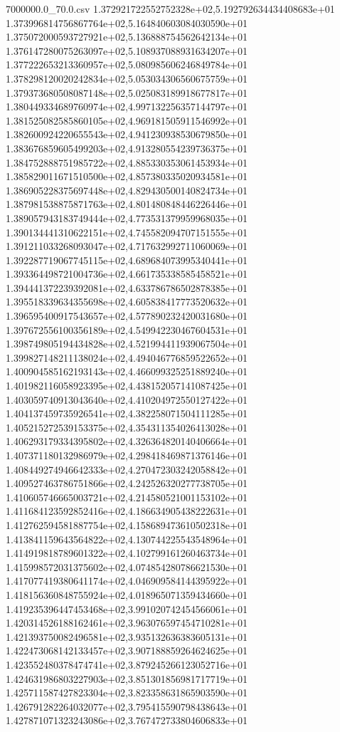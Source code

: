 \begin{filecontents*}{7000000.0_70.0.csv}
1.372921722552752328e+02,5.192792634434408683e+01
1.373996814756867764e+02,5.164840603084030590e+01
1.375072000593727921e+02,5.136888754562642134e+01
1.376147280075263097e+02,5.108937088931634207e+01
1.377222653213360957e+02,5.080985606246849784e+01
1.378298120020242834e+02,5.053034306560675759e+01
1.379373680508087148e+02,5.025083189918677817e+01
1.380449334689760974e+02,4.997132256357144797e+01
1.381525082585860105e+02,4.969181505911546992e+01
1.382600924220655543e+02,4.941230938530679850e+01
1.383676859605499203e+02,4.913280554239736375e+01
1.384752888751985722e+02,4.885330353061453934e+01
1.385829011671510500e+02,4.857380335020934581e+01
1.386905228375697448e+02,4.829430500140824734e+01
1.387981538875871763e+02,4.801480848446226446e+01
1.389057943183749444e+02,4.773531379959968035e+01
1.390134441310622151e+02,4.745582094707151555e+01
1.391211033268093047e+02,4.717632992711060069e+01
1.392287719067745115e+02,4.689684073995340441e+01
1.393364498721004736e+02,4.661735338585458521e+01
1.394441372239392081e+02,4.633786786502878385e+01
1.395518339634355698e+02,4.605838417773520632e+01
1.396595400917543657e+02,4.577890232420031680e+01
1.397672556100356189e+02,4.549942230467604531e+01
1.398749805194434828e+02,4.521994411939067504e+01
1.399827148211138024e+02,4.494046776859522652e+01
1.400904585162193143e+02,4.466099325251889240e+01
1.401982116058923395e+02,4.438152057141087425e+01
1.403059740913043640e+02,4.410204972550127422e+01
1.404137459735926541e+02,4.382258071504111285e+01
1.405215272539153375e+02,4.354311354026413028e+01
1.406293179334395802e+02,4.326364820140406664e+01
1.407371180132986979e+02,4.298418469871376146e+01
1.408449274946642333e+02,4.270472303242058842e+01
1.409527463786751866e+02,4.242526320277738705e+01
1.410605746665003721e+02,4.214580521001153102e+01
1.411684123592852416e+02,4.186634905438222631e+01
1.412762594581887754e+02,4.158689473610502318e+01
1.413841159643564822e+02,4.130744225543548964e+01
1.414919818789601322e+02,4.102799161260463734e+01
1.415998572031375602e+02,4.074854280786621530e+01
1.417077419380641174e+02,4.046909584144395922e+01
1.418156360848755924e+02,4.018965071359434660e+01
1.419235396447453468e+02,3.991020742454566061e+01
1.420314526188162461e+02,3.963076597454710281e+01
1.421393750082496581e+02,3.935132636383605131e+01
1.422473068142133457e+02,3.907188859264624625e+01
1.423552480378474741e+02,3.879245266123052716e+01
1.424631986803227903e+02,3.851301856981717719e+01
1.425711587427823304e+02,3.823358631865903590e+01
1.426791282264032077e+02,3.795415590798438643e+01
1.427871071323243086e+02,3.767472733804606833e+01

\end{filecontents*}
